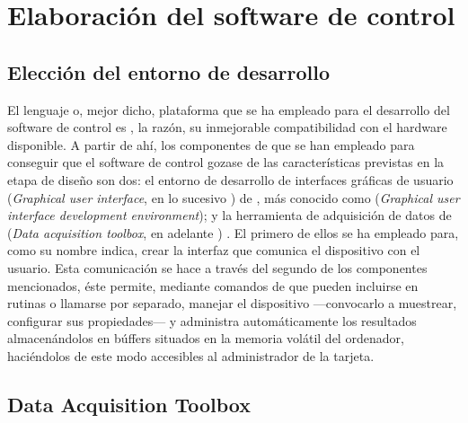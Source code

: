 \section{Elaboración del software de control}


\subsection{Elección del entorno de desarrollo}\label{subsec:environment}

El lenguaje o, mejor dicho, plataforma que se ha empleado para el desarrollo del software de control es \matlab{}, la razón, su inmejorable compatibilidad con el hardware disponible. A partir de ahí, los componentes de \matlab{} que se han empleado para conseguir que el software de control gozase de las características previstas en la etapa de diseño son dos: el entorno de desarrollo de interfaces gráficas de usuario (\emph{Graphical user interface}, en lo sucesivo ) de \matlab{}, más conocido como  (\emph{Graphical user interface development environment}); y la herramienta de adquisición de datos de \matlab{} (\emph{Data acquisition toolbox}, en adelante ) . El primero de ellos se ha empleado para, como su nombre indica, crear la interfaz que comunica el dispositivo con el usuario. Esta comunicación se hace a través del segundo de los componentes mencionados, éste permite, mediante comandos de \matlab{} que pueden incluirse en rutinas o llamarse por separado, manejar el dispositivo ---convocarlo a muestrear, configurar sus propiedades--- y administra automáticamente los resultados almacenándolos en búffers situados en la memoria volátil del ordenador, haciéndolos de este modo accesibles al administrador de la tarjeta.


\subsection{Data Acquisition Toolbox}

